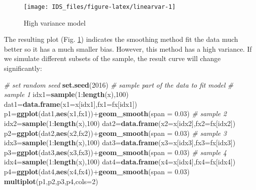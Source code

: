 \documentclass[12pt,]{krantz}
\newenvironment{Shaded}{\begin{snugshade}}{\end{snugshade}}
\newcommand{\KeywordTok}[1]{\textcolor[rgb]{0.13,0.29,0.53}{\textbf{{#1}}}}
\newcommand{\DataTypeTok}[1]{\textcolor[rgb]{0.13,0.29,0.53}{{#1}}}
\newcommand{\DecValTok}[1]{\textcolor[rgb]{0.00,0.00,0.81}{{#1}}}
\newcommand{\FloatTok}[1]{\textcolor[rgb]{0.00,0.00,0.81}{{#1}}}
\newcommand{\CommentTok}[1]{\textcolor[rgb]{0.56,0.35,0.01}{\textit{{#1}}}}
\newcommand{\NormalTok}[1]{{#1}}
\theoremstyle{definition}
\theoremstyle{definition}
\theoremstyle{remark}
\begin{document}
\begin{figure}

{\centering \texttt{[image: IDS\_files/figure-latex/linearvar-1]} 

}

\caption{High variance model}\label{fig:linearvar}
\end{figure}

The resulting plot (Fig. \ref{fig:linearvar}) indicates the smoothing
method fit the data much better so it has a much smaller bias. However,
this method has a high variance. If we simulate different subsets of the
sample, the result curve will change significantly:

\begin{Shaded}
\begin{Highlighting}[]
\CommentTok{# set random seed}
\KeywordTok{set.seed}\NormalTok{(}\DecValTok{2016}\NormalTok{)}
\CommentTok{# sample part of the data to fit model}
\CommentTok{# sample 1}
\NormalTok{idx1=}\KeywordTok{sample}\NormalTok{(}\DecValTok{1}\NormalTok{:}\KeywordTok{length}\NormalTok{(x),}\DecValTok{100}\NormalTok{)}
\NormalTok{dat1=}\KeywordTok{data.frame}\NormalTok{(}\DataTypeTok{x1=}\NormalTok{x[idx1],}\DataTypeTok{fx1=}\NormalTok{fx[idx1])}
\NormalTok{p1=}\KeywordTok{ggplot}\NormalTok{(dat1,}\KeywordTok{aes}\NormalTok{(x1,fx1))+}\KeywordTok{geom_smooth}\NormalTok{(}\DataTypeTok{span =} \FloatTok{0.03}\NormalTok{)}
\CommentTok{# sample 2}
\NormalTok{idx2=}\KeywordTok{sample}\NormalTok{(}\DecValTok{1}\NormalTok{:}\KeywordTok{length}\NormalTok{(x),}\DecValTok{100}\NormalTok{)}
\NormalTok{dat2=}\KeywordTok{data.frame}\NormalTok{(}\DataTypeTok{x2=}\NormalTok{x[idx2],}\DataTypeTok{fx2=}\NormalTok{fx[idx2])}
\NormalTok{p2=}\KeywordTok{ggplot}\NormalTok{(dat2,}\KeywordTok{aes}\NormalTok{(x2,fx2))+}\KeywordTok{geom_smooth}\NormalTok{(}\DataTypeTok{span =} \FloatTok{0.03}\NormalTok{)}
\CommentTok{# sample 3}
\NormalTok{idx3=}\KeywordTok{sample}\NormalTok{(}\DecValTok{1}\NormalTok{:}\KeywordTok{length}\NormalTok{(x),}\DecValTok{100}\NormalTok{)}
\NormalTok{dat3=}\KeywordTok{data.frame}\NormalTok{(}\DataTypeTok{x3=}\NormalTok{x[idx3],}\DataTypeTok{fx3=}\NormalTok{fx[idx3])}
\NormalTok{p3=}\KeywordTok{ggplot}\NormalTok{(dat3,}\KeywordTok{aes}\NormalTok{(x3,fx3))+}\KeywordTok{geom_smooth}\NormalTok{(}\DataTypeTok{span =} \FloatTok{0.03}\NormalTok{)}
\CommentTok{# sample 4}
\NormalTok{idx4=}\KeywordTok{sample}\NormalTok{(}\DecValTok{1}\NormalTok{:}\KeywordTok{length}\NormalTok{(x),}\DecValTok{100}\NormalTok{)}
\NormalTok{dat4=}\KeywordTok{data.frame}\NormalTok{(}\DataTypeTok{x4=}\NormalTok{x[idx4],}\DataTypeTok{fx4=}\NormalTok{fx[idx4])}
\NormalTok{p4=}\KeywordTok{ggplot}\NormalTok{(dat4,}\KeywordTok{aes}\NormalTok{(x4,fx4))+}\KeywordTok{geom_smooth}\NormalTok{(}\DataTypeTok{span =} \FloatTok{0.03}\NormalTok{)}
\KeywordTok{multiplot}\NormalTok{(p1,p2,p3,p4,}\DataTypeTok{cols=}\DecValTok{2}\NormalTok{)}
\end{Highlighting}
\end{Shaded}
\end{document}
